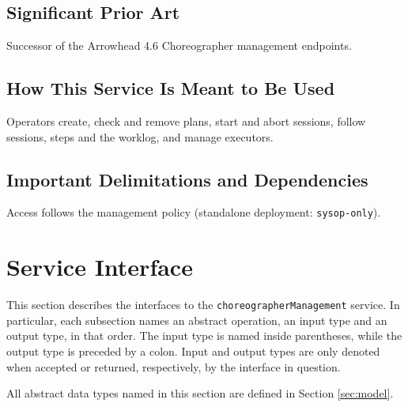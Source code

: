 \documentclass[a4paper]{arrowhead}
\begin{document}
\subsection{Significant Prior Art}

Successor of the Arrowhead 4.6 Choreographer management endpoints.

\subsection{How This Service Is Meant to Be Used}

Operators create, check and remove plans, start and abort sessions, follow sessions, steps and the worklog, and manage executors.

\subsection{Important Delimitations and Dependencies}
\label{sec:delimitations}

Access follows the management policy (standalone deployment: \texttt{sysop-\allowbreak{}only}).

\newpage

\section{Service Interface}
\label{sec:operations}

This section describes the interfaces to the \texttt{choreographer\allowbreak{}Management} service.
In particular, each subsection names an abstract operation, an input type and an output type, in that order.
The input type is named inside parentheses, while the output type is preceded by a colon.
Input and output types are only denoted when accepted or returned, respectively, by the interface in question.

All abstract data types named in this section are defined in Section \ref{sec:model}.
\end{document}
